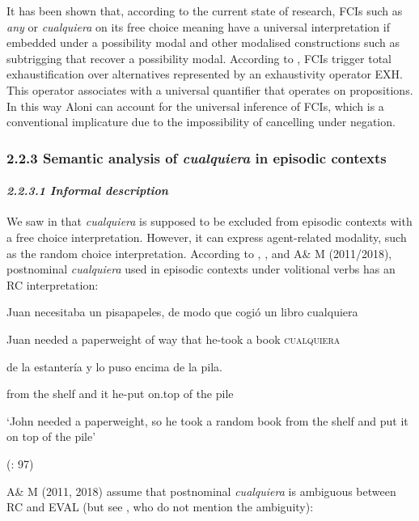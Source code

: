 \documentclass[output=paper]{langscibook}
\begin{document}
It has been shown that, according to the current state of research, FCIs such as \textit{any} or \textit{cualquiera} on its free choice meaning have a universal interpretation if embedded under a possibility modal and other modalised constructions such as subtrigging that recover a possibility modal. According to \citet{Aloni2007}, FCIs trigger total exhaustification over alternatives represented by an exhaustivity operator EXH. This operator associates with a universal quantifier that operates on propositions. In this way Aloni can account for the universal inference of FCIs, which is a conventional implicature due to the impossibility of cancelling under negation.

\subsubsection{\textbf{2.2.3} \textbf{Semantic} \textbf{analysis} \textbf{of} \textbf{\textit{cualquiera}} \textbf{in} \textbf{episodic} \textbf{contexts} }
\paragraph{\textit{2.2.3.1 Informal description}}

We saw in  that \textit{cualquiera} is supposed to be excluded from episodic contexts with a free choice interpretation. However, it can express agent-related modality, such as the random choice interpretation. According to \citet{Choi2007}, \citet{ChoiRomero2008}, and A\& M (2011/2018), postnominal \textit{cualquiera} used in episodic contexts under volitional verbs has an RC interpretation:

  Juan  necesitaba  un  pisapapeles,  de  modo  que  cogió  un  libro  cualquiera

  Juan  needed  a  paperweight  of  way  that  he-took  a  book  \textsc{cualquiera}

  de  la  estantería  y  lo  puso  encima  de  la  pila.  

  from  the  shelf  and  it  he-put  on.top  of  the  pile  

  ‘John needed a paperweight, so he took a random book from the shelf and put it on top of the pile’

  (\citealt{ChoiRomero2008}: 97)

A\& M (2011, 2018) assume that postnominal \textit{cualquiera} is ambiguous between RC and EVAL (but see \citealt{ChoiRomero2008}, who do not mention the ambiguity):
\end{document}
